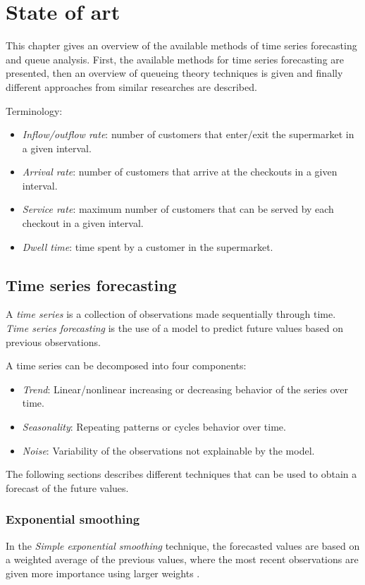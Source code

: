 \chapter{State of art}
\label{cha:state_of_art}

This chapter gives an overview of the available methods of time series forecasting and queue analysis. First, the available methods for time series forecasting are presented, then an overview of queueing theory techniques is given and finally different approaches from similar researches are described.

Terminology:
\begin{itemize}
  \item \emph{Inflow/outflow rate}: number of customers that enter/exit the supermarket in a given interval.
  \item \emph{Arrival rate}: number of customers that arrive at the checkouts in a given interval.
  \item \emph{Service rate}: maximum number of customers that can be served by each checkout in a given interval.
  \item \emph{Dwell time}: time spent by a customer in the supermarket.
\end{itemize}


\section{Time series forecasting}
\label{sec:time_series_forecasting}

A \emph{time series} is a collection of observations made sequentially through time. \emph{Time series forecasting} is the use of a model to predict future values based on previous observations.

A time series can be decomposed into four components:
\begin{itemize}
  \item \emph{Trend}: Linear/nonlinear increasing or decreasing behavior of the series over time.
  \item \emph{Seasonality}: Repeating patterns or cycles behavior over time.
  \item \emph{Noise}: Variability of the observations not explainable by the model.
\end{itemize}

The following sections describes different techniques that can be used to obtain a forecast of the future values.


\subsection{Exponential smoothing}
\label{subsec:exponential_smoothing}
In the \emph{Simple exponential smoothing} technique, the forecasted values are based on a weighted average of the previous values, where the most recent observations are given more importance using larger weights \cite{hyndman}.

